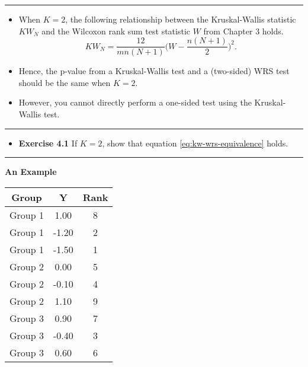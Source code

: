 \documentclass[]{book}
\providecommand{\tightlist}{%
  \setlength{\itemsep}{0pt}\setlength{\parskip}{0pt}}
\begin{document}
\begin{center}\rule{0.5\linewidth}{\linethickness}\end{center}

\begin{itemize}
\item
  When \(K=2\), the following relationship between the Kruskal-Wallis statistic
  \(KW_{N}\) and the Wilcoxon rank sum test statistic \(W\) from Chapter 3 holds.
  \begin{equation}
  KW_{N} = \frac{12}{mn(N+1)}\Big( W - \frac{n(N+1)}{2}  \Big)^{2}.
  \label{eq:kw-wrs-equivalence}
  \end{equation}
\item
  Hence, the p-value from a Kruskal-Wallis test and a (two-sided)
  WRS test should be the same when \(K = 2\).
\item
  However, you cannot directly perform a one-sided test using
  the Kruskal-Wallis test.
\end{itemize}

\begin{center}\rule{0.5\linewidth}{\linethickness}\end{center}

\begin{itemize}
\tightlist
\item
  \textbf{Exercise 4.1} If \(K=2\), show that equation \eqref{eq:kw-wrs-equivalence} holds.
\end{itemize}

\begin{center}\rule{0.5\linewidth}{\linethickness}\end{center}

\textbf{An Example}

\begin{table}[ht]
\centering
\begin{tabular}{ccc}
  \hline
Group & Y & Rank \\ 
  \hline
Group 1 & 1.00 & 8 \\ 
  Group 1 & -1.20 & 2 \\ 
  Group 1 & -1.50 & 1 \\ 
  Group 2 & 0.00 & 5 \\ 
  Group 2 & -0.10 & 4 \\ 
  Group 2 & 1.10 & 9 \\ 
  Group 3 & 0.90 & 7 \\ 
  Group 3 & -0.40 & 3 \\ 
  Group 3 & 0.60 & 6 \\ 
   \hline
\end{tabular}
\end{table}
\end{document}
